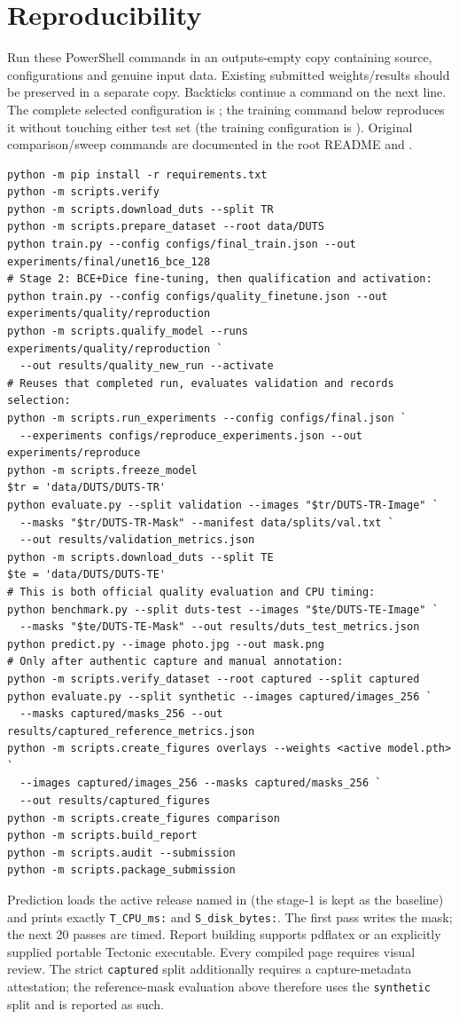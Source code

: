 \documentclass[11pt,a4paper]{article}
\begin{document}
\section{Reproducibility}
Run these PowerShell commands in an outputs-empty copy containing source, configurations and genuine input data. Existing submitted weights/results should be preserved in a separate copy. Backticks continue a command on the next line. The complete selected configuration is ; the training command below reproduces it without touching either test set (the training configuration is ). Original comparison/sweep commands are documented in the root README and .
{\footnotesize
\begin{verbatim}
python -m pip install -r requirements.txt
python -m scripts.verify
python -m scripts.download_duts --split TR
python -m scripts.prepare_dataset --root data/DUTS
python train.py --config configs/final_train.json --out experiments/final/unet16_bce_128
# Stage 2: BCE+Dice fine-tuning, then qualification and activation:
python train.py --config configs/quality_finetune.json --out experiments/quality/reproduction
python -m scripts.qualify_model --runs experiments/quality/reproduction `
  --out results/quality_new_run --activate
# Reuses that completed run, evaluates validation and records selection:
python -m scripts.run_experiments --config configs/final.json `
  --experiments configs/reproduce_experiments.json --out experiments/reproduce
python -m scripts.freeze_model
$tr = 'data/DUTS/DUTS-TR'
python evaluate.py --split validation --images "$tr/DUTS-TR-Image" `
  --masks "$tr/DUTS-TR-Mask" --manifest data/splits/val.txt `
  --out results/validation_metrics.json
python -m scripts.download_duts --split TE
$te = 'data/DUTS/DUTS-TE'
# This is both official quality evaluation and CPU timing:
python benchmark.py --split duts-test --images "$te/DUTS-TE-Image" `
  --masks "$te/DUTS-TE-Mask" --out results/duts_test_metrics.json
python predict.py --image photo.jpg --out mask.png
# Only after authentic capture and manual annotation:
python -m scripts.verify_dataset --root captured --split captured
python evaluate.py --split synthetic --images captured/images_256 `
  --masks captured/masks_256 --out results/captured_reference_metrics.json
python -m scripts.create_figures overlays --weights <active model.pth> `
  --images captured/images_256 --masks captured/masks_256 `
  --out results/captured_figures
python -m scripts.create_figures comparison
python -m scripts.build_report
python -m scripts.audit --submission
python -m scripts.package_submission
\end{verbatim}}
Prediction loads the active release named in  (the stage-1  is kept as the baseline) and prints exactly \texttt{T\_CPU\_ms:} and \texttt{S\_disk\_bytes:}. The first pass writes the mask; the next 20 passes are timed. Report building supports pdflatex or an explicitly supplied portable Tectonic executable. Every compiled page requires visual review. The strict \texttt{captured} split additionally requires a capture-metadata attestation; the reference-mask evaluation above therefore uses the \texttt{synthetic} split and is reported as such.
\end{document}
